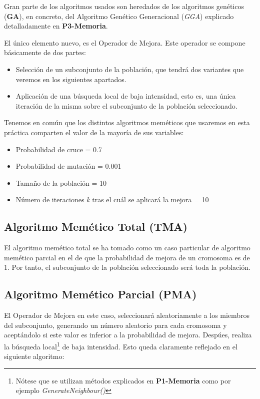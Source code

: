 \documentclass[a4paper, 11pt]{article}
\begin{document}
			Gran parte de los algoritmos usados son heredados de los algoritmos genéticos (\textbf{GA}),
			en concreto, del Algoritmo Genético Generacional (\textit{GGA}) explicado detalladamente en
			\textbf{P3-Memoria}.
			
			El único elemento nuevo, es el Operador de Mejora. Este operador se compone básicamente
			de dos partes:
			\begin{itemize}
				\item Selección de un subconjunto de la población, que tendrá dos variantes que veremos
				en los siguientes apartados.
				\item Aplicación de una búsqueda local de baja intensidad, esto es, una única iteración
				de la misma sobre el subconjunto de la población seleccionado.
			\end{itemize}
			
			Tenemos en común que los distintos algoritmos meméticos que usaremos en esta práctica comparten
			el valor de la mayoría de sus variables:
			\begin{itemize}
				\item Probabilidad de cruce = 0.7
				\item Probabilidad de mutación = 0.001
				\item Tamaño de la población = 10
				\item Número de iteraciones \textit{k} tras el cuál se aplicará la mejora = 10
			\end{itemize}
			
		\subsection{Algoritmo Memético Total (\textbf{TMA})}
			El algoritmo memético total se ha tomado como un caso particular de algoritmo memético parcial
			en el de que la probabilidad de mejora de un cromosoma es de 1. Por tanto, el subconjunto
			de la población seleccionado será toda la población.
		
		\subsection{Algoritmo Memético Parcial (\textbf{PMA})}
			El Operador de Mejora en este caso, seleccionará aleatoriamente a los miembros del subconjunto,
			generando un número aleatorio para cada cromosoma y aceptándolo si este valor es inferior a
			la probabilidad de mejora. Despúes, realiza la búsqueda local\footnote{Nótese que se utilizan
			métodos explicados en \textbf{P1-Memoria} como por ejemplo \textit{GenerateNeighbour()}} de
			baja intensidad. Esto queda claramente reflejado en el siguiente algoritmo:
			
\end{document}

